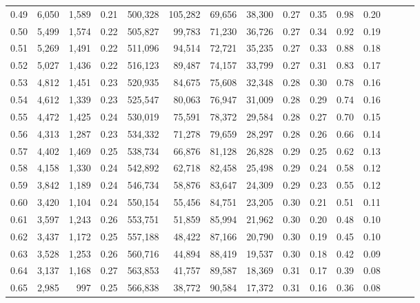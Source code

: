 \begin{tabular}{rrrrrrrrrrrrrrr}
0.49 &   6,050 &  1,589 &  0.21 &  500,328 &  105,282 &   69,656 &   38,300 &  0.27 &  0.35 &  0.98 &      0.20 \\
0.50 &   5,499 &  1,574 &  0.22 &  505,827 &   99,783 &   71,230 &   36,726 &  0.27 &  0.34 &  0.92 &      0.19 \\
0.51 &   5,269 &  1,491 &  0.22 &  511,096 &   94,514 &   72,721 &   35,235 &  0.27 &  0.33 &  0.88 &      0.18 \\
0.52 &   5,027 &  1,436 &  0.22 &  516,123 &   89,487 &   74,157 &   33,799 &  0.27 &  0.31 &  0.83 &      0.17 \\
0.53 &   4,812 &  1,451 &  0.23 &  520,935 &   84,675 &   75,608 &   32,348 &  0.28 &  0.30 &  0.78 &      0.16 \\
0.54 &   4,612 &  1,339 &  0.23 &  525,547 &   80,063 &   76,947 &   31,009 &  0.28 &  0.29 &  0.74 &      0.16 \\
0.55 &   4,472 &  1,425 &  0.24 &  530,019 &   75,591 &   78,372 &   29,584 &  0.28 &  0.27 &  0.70 &      0.15 \\
0.56 &   4,313 &  1,287 &  0.23 &  534,332 &   71,278 &   79,659 &   28,297 &  0.28 &  0.26 &  0.66 &      0.14 \\
0.57 &   4,402 &  1,469 &  0.25 &  538,734 &   66,876 &   81,128 &   26,828 &  0.29 &  0.25 &  0.62 &      0.13 \\
0.58 &   4,158 &  1,330 &  0.24 &  542,892 &   62,718 &   82,458 &   25,498 &  0.29 &  0.24 &  0.58 &      0.12 \\
0.59 &   3,842 &  1,189 &  0.24 &  546,734 &   58,876 &   83,647 &   24,309 &  0.29 &  0.23 &  0.55 &      0.12 \\
0.60 &   3,420 &  1,104 &  0.24 &  550,154 &   55,456 &   84,751 &   23,205 &  0.30 &  0.21 &  0.51 &      0.11 \\
0.61 &   3,597 &  1,243 &  0.26 &  553,751 &   51,859 &   85,994 &   21,962 &  0.30 &  0.20 &  0.48 &      0.10 \\
0.62 &   3,437 &  1,172 &  0.25 &  557,188 &   48,422 &   87,166 &   20,790 &  0.30 &  0.19 &  0.45 &      0.10 \\
0.63 &   3,528 &  1,253 &  0.26 &  560,716 &   44,894 &   88,419 &   19,537 &  0.30 &  0.18 &  0.42 &      0.09 \\
0.64 &   3,137 &  1,168 &  0.27 &  563,853 &   41,757 &   89,587 &   18,369 &  0.31 &  0.17 &  0.39 &      0.08 \\
0.65 &   2,985 &    997 &  0.25 &  566,838 &   38,772 &   90,584 &   17,372 &  0.31 &  0.16 &  0.36 &      0.08 \\

\end{tabular}
